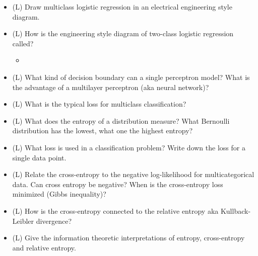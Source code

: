 \begin{itemize}
    \item (L) Draw multiclass logistic regression in an electrical engineering style diagram.
    \answerboxM
    \item (L) How is the engineering style diagram of two-class logistic regression called?
    \begin{itemize}
        \item {}
    \end{itemize}
    \answerboxM
    \item (L) What kind of decision boundary can a single perceptron model? What is the advantage
    of a multilayer perceptron (aka neural network)?
    \answerboxM
    \item (L) What is the typical loss for multiclass classification?
    \answerboxM
    \item (L) What does the entropy of a distribution measure? What Bernoulli distribution has the lowest, what one the highest entropy?
    \answerboxM
    \item (L) What loss is used in a classification problem? Write down the loss for a single data point.
    \answerboxM
    \item (L) Relate the cross-entropy to the negative log-likelihood for multicategorical data. Can cross entropy be negative? When is the 
    cross-entropy loss minimized (Gibbs inequality)?
    \answerboxM
    \item (L) How is the cross-entropy connected to the relative entropy aka Kullback-Leibler divergence?
    \answerboxM
    \item (L) Give the information theoretic interpretations of entropy, cross-entropy and relative entropy.
    \answerboxL
\end{itemize}

